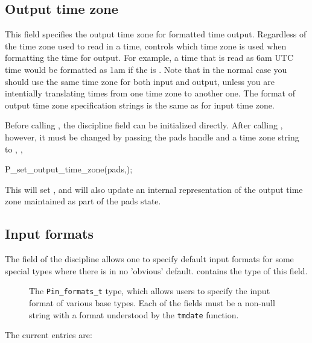 \subsection{Output time zone}
\label{sec:library-customization-output-time-zone}
This field specifies the output time zone for formatted time output.
Regardless of the time zone used to read in a time,
 controls which time zone is used when
formatting the time for output.  For example, a time that is read as 6am UTC time
would be formatted as 1am if the  is .
Note that in the normal case you should use the same time zone
for both input and output, unless you are intentially translating
times from one time zone to another one. The format of output time
zone specification strings is the same as for input time zone.

Before calling , the discipline field 
can be initialized directly.  After calling , however, it
must be changed by passing the pads handle and a time zone string to 
, \eg{},

\begin{centercode}
    P\_set\_output\_time\_zone(pads,);
\end{centercode}

This will set , and will also update
an internal representation of the output time zone maintained as part of
the pads state.

\subsection{Input formats}
\label{sec:library-customization-input-formats}
The  field of the discipline allows one to specify
default input formats for some special types where there is 
in no 'obvious' default.  contains the type
of this field.
\begin{figure}
\caption{The \texttt{Pin\_formats\_t} type, which allows users to specify the
  input format of various \pads{} base types. Each of the fields must
  be a non-null string with a format understood by the \texttt{tmdate} function.}
\label{fig:input-formats}
\end{figure}
The current entries are:

